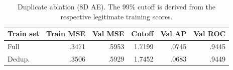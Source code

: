 \begin{table}[H]
\centering\footnotesize\setlength{\tabcolsep}{3pt}
\caption{Duplicate ablation (8D AE). The 99\% cutoff is derived from the respective legitimate training scores.}
\label{tab:ablation}
\begin{tabular}{@{}lrrrrr@{}}
\toprule
Train set & Train MSE & Val MSE & Cutoff & Val AP & Val ROC \\
\midrule
Full & .3471 & .5953 & 1.7199 & .0745 & .9445 \\
Dedup. & .3506 & .5929 & 1.7452 & .0683 & .9449 \\
\bottomrule
\end{tabular}
\end{table}
